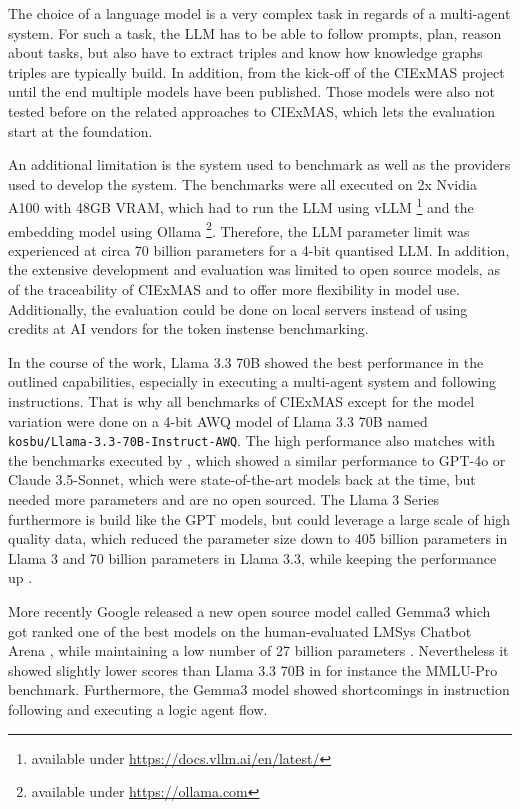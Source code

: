 \documentclass[a4paper,oneside,bibliography=totoc]{scrbook}
\begin{document}
The choice of a language model is a very complex task in regards of a multi-agent system. For such a task, the \ac{LLM} has to be able to follow prompts, plan, reason about tasks, but also have to extract triples and know how knowledge graphs triples are typically build. In addition, from the kick-off of the CIExMAS project until the end multiple models have been published. Those models were also not tested before on the related approaches to CIExMAS, which lets the evaluation start at the foundation.

An additional limitation is the system used to benchmark as well as the providers used to develop the system. The benchmarks were all executed on 2x Nvidia A100 with 48GB VRAM, which had to run the \ac{LLM} using vLLM \footnote{available under \url{https://docs.vllm.ai/en/latest/}} and the embedding model using Ollama \footnote{available under \url{https://ollama.com}}. Therefore, the \ac{LLM} parameter limit was experienced at circa 70 billion parameters for a 4-bit quantised \ac{LLM}. In addition, the extensive development and evaluation was limited to open source models, as of the traceability of CIExMAS and to offer more flexibility in model use. Additionally, the evaluation could be done on local servers instead of using credits at AI vendors for the token instense benchmarking.

In the course of the work, Llama 3.3 70B showed the best performance in the outlined capabilities, especially in executing a multi-agent system and following instructions. That is why all benchmarks of CIExMAS except for the model variation were done on a 4-bit AWQ model of Llama 3.3 70B named \texttt{kosbu/Llama-3.3-70B-Instruct-AWQ}. The high performance also matches with the benchmarks executed by \citet{Meta2024}, which showed a similar performance to GPT-4o or Claude 3.5-Sonnet, which were state-of-the-art models back at the time, but needed more parameters and are no open sourced. The Llama 3 Series furthermore is build like the GPT models, but could leverage a large scale of high quality data, which reduced the parameter size down to 405 billion parameters in Llama 3 and 70 billion parameters in Llama 3.3, while keeping the performance up \cite{Grattafiori2024,Meta2024}.

More recently Google released a new open source model called Gemma3 which got ranked one of the best models on the human-evaluated LMSys Chatbot Arena \cite{Chiang2024}, while maintaining a low number of 27 billion parameters \cite{Team2025}. Nevertheless it showed slightly lower scores than Llama 3.3 70B in for instance the MMLU-Pro benchmark. Furthermore, the Gemma3 model showed shortcomings in instruction following and executing a logic agent flow.
\end{document}
